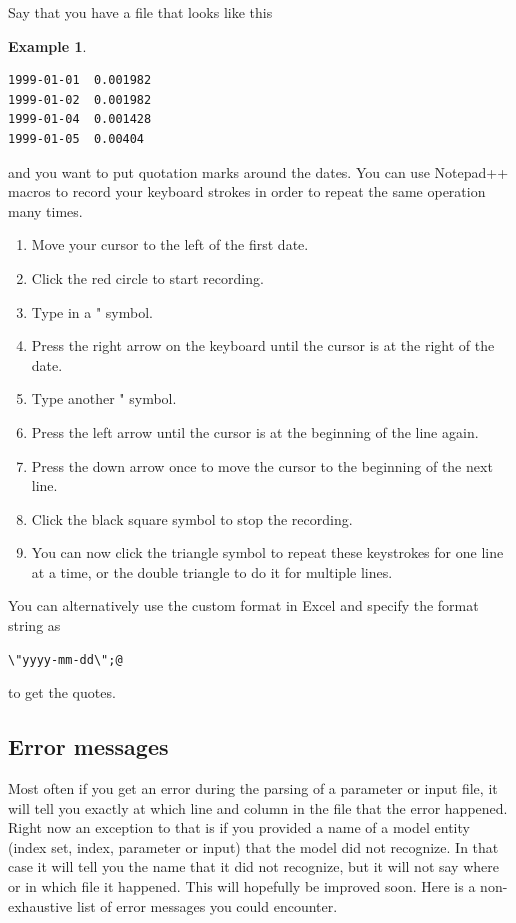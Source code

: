 \documentclass[11pt]{article}
\theoremstyle{definition}
\newtheorem{myexample}{Example}
\newenvironment{example}%
  {\begin{lrbox}{\examplebox}%
   \begin{minipage}{\dimexpr\linewidth-2\fboxsep}
   \begin{myexample}}%
  {\end{myexample}%
   \end{minipage}%
   \end{lrbox}%
   \begin{trivlist}
     \item[]\colorbox{silver}{\usebox\examplebox}
   \end{trivlist}}
\begin{document}
Say that you have a file that looks like this
\begin{example}
\begin{lstlisting}
1999-01-01	0.001982
1999-01-02	0.001982
1999-01-04	0.001428
1999-01-05	0.00404
\end{lstlisting}
\end{example}
and you want to put quotation marks around the dates. You can use Notepad++ macros to record your keyboard strokes in order to repeat the same operation many times.
\begin{enumerate}[i]
\item Move your cursor to the left of the first date.
\item Click the red circle to start recording.
\item Type in a " symbol.
\item Press the right arrow on the keyboard until the cursor is at the right of the date.
\item Type another " symbol.
\item Press the left arrow until the cursor is at the beginning of the line again.
\item Press the down arrow once to move the cursor to the beginning of the next line.
\item Click the black square symbol to stop the recording.
\item You can now click the triangle symbol to repeat these keystrokes for one line at a time, or the double triangle to do it for multiple lines.
\end{enumerate}

You can alternatively use the custom format in Excel and specify the format string as 
\begin{lstlisting}
\"yyyy-mm-dd\";@
\end{lstlisting}
to get the quotes.

\subsection{Error messages}

Most often if you get an error during the parsing of a parameter or input file, it will tell you exactly at which line and column in the file that the error happened. Right now an exception to that is if you provided a name of a model entity (index set, index, parameter or input) that the model did not recognize. In that case it will tell you the name that it did not recognize, but it will not say where or in which file it happened. This will hopefully be improved soon. Here is a non-exhaustive list of error messages you could encounter.
\end{document}
